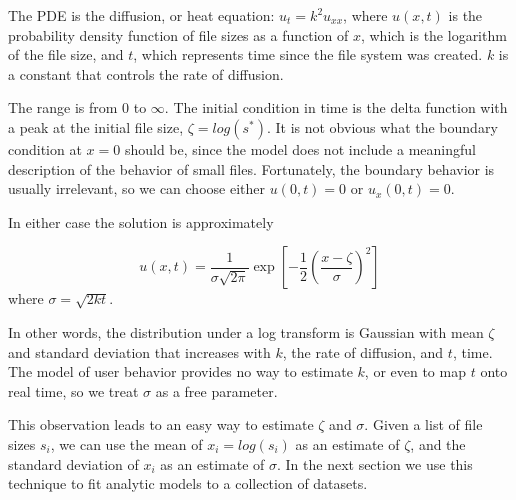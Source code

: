 \documentclass[10pt,twocolumn]{article}
\begin{document}
The PDE is the diffusion, or heat equation: $u_t = k^2 u_{xx}$,
where $u(x, t)$ is the probability density function of file sizes
as a function of $x$, which is the logarithm of the file size,
and $t$, which represents time since the file system was
created.  $k$ is a constant that controls the rate of diffusion.

The range is from 0 to $\infty$.  The
initial condition in time is the delta
function with a peak at the initial file size, $\zeta = log (s^*)$.
It is not obvious what the boundary condition at $x=0$ should be,
since the model does not include a meaningful description of the
behavior of small files.  Fortunately, the boundary behavior is
usually irrelevant, so we can choose either $u(0, t) = 0$ or $u_x (0,
t) = 0$.


In either case the solution is approximately

%
\begin{equation}
u(x,t) = \frac{1}{\sigma \sqrt{2 \pi}}
\exp \left[ - \frac{1}{2} \left( \frac {x - \zeta} {\sigma} \right) ^2 \right]
\end{equation}
%
where $\sigma = \sqrt{2kt}$.

In other words, the distribution under a log transform
is Gaussian with mean $\zeta$ and standard deviation that
increases with $k$, the rate of diffusion, and $t$, time.
The model of user behavior provides no way to estimate $k$,
or even to map $t$ onto real time, so we treat
$\sigma$ as a free parameter.

This observation leads to an easy way to estimate $\zeta$ and
$\sigma$.  Given a list of file sizes $s_i$, we can use the mean of
$x_i = log(s_i)$ as an estimate of $\zeta$, and the standard deviation
of $x_i$ as an estimate of $\sigma$.  In the next section we use
this technique to fit analytic models to a collection of datasets.


\label{accurate}
\end{document}
